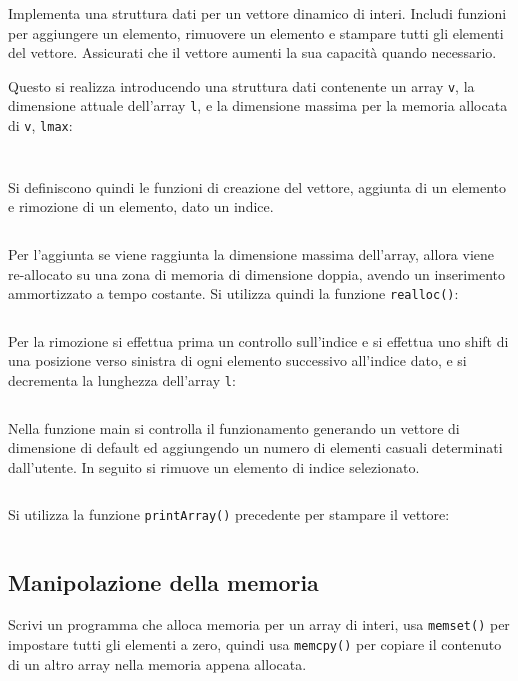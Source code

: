 \documentclass{article}
\numberwithin{equation}{subsection}
\begin{document}
Implementa una struttura dati per un vettore dinamico di interi. Includi funzioni per aggiungere un elemento, rimuovere un elemento e stampare tutti gli elementi del vettore. Assicurati che il vettore aumenti la sua capacità quando necessario. 

Questo si realizza introducendo una struttura dati contenente un array \verb|v|, la dimensione 
attuale dell'array \verb|l|, e la dimensione massima per la memoria allocata di \verb|v|, \verb|lmax|:

\inputminted[firstline=1, lastline=5]{c}{./Esercitazione del 19-11-24/domanda2.c}
\inputminted[firstline=13, lastline=17]{c}{./Esercitazione del 19-11-24/domanda2.c}

Si definiscono quindi le funzioni di creazione del vettore, aggiunta di un 
elemento e rimozione di un elemento, dato un indice. 

\inputminted[firstline=21, lastline=29]{c}{./Esercitazione del 19-11-24/domanda2.c}
Per l'aggiunta se viene raggiunta la dimensione massima dell'array, allora viene 
re-allocato su una zona di memoria di dimensione doppia, avendo un inserimento 
ammortizzato a tempo costante. Si utilizza quindi la funzione \verb|realloc()|:
\inputminted[firstline=33, lastline=40]{c}{./Esercitazione del 19-11-24/domanda2.c}
Per la rimozione si effettua prima un controllo sull'indice e si effettua uno shift 
di una posizione verso sinistra di ogni elemento successivo all'indice dato, e si 
decrementa la lunghezza dell'array \verb|l|:
\inputminted[firstline=43, lastline=51]{c}{./Esercitazione del 19-11-24/domanda2.c}

Nella funzione main si controlla il funzionamento generando un vettore di dimensione 
di default ed aggiungendo un numero di elementi casuali determinati dall'utente. In seguito si rimuove un elemento di indice selezionato. \inputminted[firstline=66, lastline=81]{c}{./Esercitazione del 19-11-24/domanda2.c} 
Si utilizza la funzione \verb|printArray()| precedente per stampare il vettore:
\inputminted[firstline=58, lastline=64]{c}{./Esercitazione del 19-11-24/domanda2.c}

\subsection{Manipolazione della memoria}

Scrivi un programma che alloca memoria per un array di interi, usa \verb|memset()| per impostare tutti gli elementi a zero, quindi usa \verb|memcpy()| per copiare il contenuto di un altro array nella memoria appena allocata.
\end{document}
